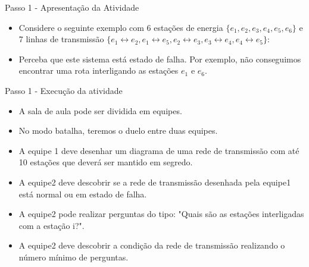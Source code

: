 \documentclass{beamer}
\begin{document}
\begin{frame}{Passo 1 - Apresentação da Atividade}


\begin{itemize}
   
\item <1-> Considere o seguinte exemplo com 6 estações de energia $\{e_1,e_2,e_3,e_4,e_5, e_6\}$ e 7 linhas de transmissão $\{ e_1 \leftrightarrow e_2 ,e_1 \leftrightarrow e_5, e_2 \leftrightarrow e_3, e_3 \leftrightarrow e_4, e_4 \leftrightarrow e_5\}$:




\item <2-> Perceba que este sistema está estado de falha. Por exemplo,  não conseguimos encontrar uma rota interligando as estações $e_1$ e $e_6$.


\end{itemize}



\end{frame}


\begin{frame}{Passo 1 - Execução da atividade}


\begin{itemize}
   
\item <1-> A sala de aula pode ser dividida em equipes. 

\item <2-> No modo batalha, teremos o duelo entre duas equipes. 

\item <3-> A equipe 1 deve desenhar um diagrama de uma rede de transmissão com até 10 estações que deverá ser mantido em segredo.

\item <4-> A equipe2 deve descobrir se a rede de transmissão desenhada pela equipe1 está normal ou em estado de falha. 

\item <5-> A equipe2 pode realizar perguntas do tipo:
"Quais são as estações interligadas com a estação i?".

\item <6-> A equipe2 deve descobrir a condição da rede de transmissão realizando o número mínimo de perguntas.


\end{itemize}



\end{frame}
\end{document}
